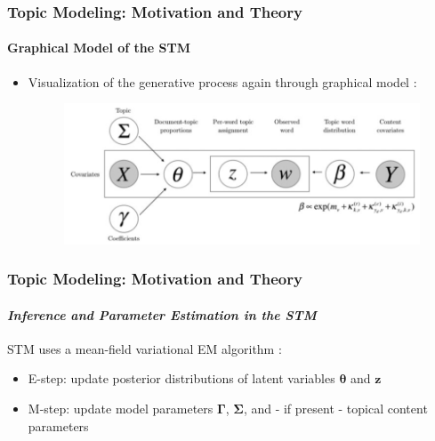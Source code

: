 \documentclass[xcolor=dvipsnames]{beamer}
\begin{document}
\begin{frame}
\frametitle{Topic Modeling: Motivation and Theory}
\framesubtitle{Graphical Model of the STM}
\begin{itemize}
\item Visualization of the generative process again through graphical model \parencite{roberts2016model}:
\begin{figure}[h!]
\centering
\hspace*{-1cm}\includegraphics[scale = 0.4]{../plots/presentation/stm_graphical.png}
\end{figure}
\end{itemize}
\end{frame}

\begin{frame}
\frametitle{Topic Modeling: Motivation and Theory}
\framesubtitle{\textit{Inference and Parameter Estimation in the STM}}
STM uses a mean-field variational EM algorithm \parencite{roberts2016model}:
\begin{itemize}
\item E-step: update posterior distributions of latent variables $\boldsymbol{\theta}$ and $\boldsymbol{z}$
\item M-step: update model parameters $\boldsymbol{\Gamma}$, $\boldsymbol{\Sigma}$, and - if present - topical content parameters
\end{itemize}
\end{frame}
\end{document}
